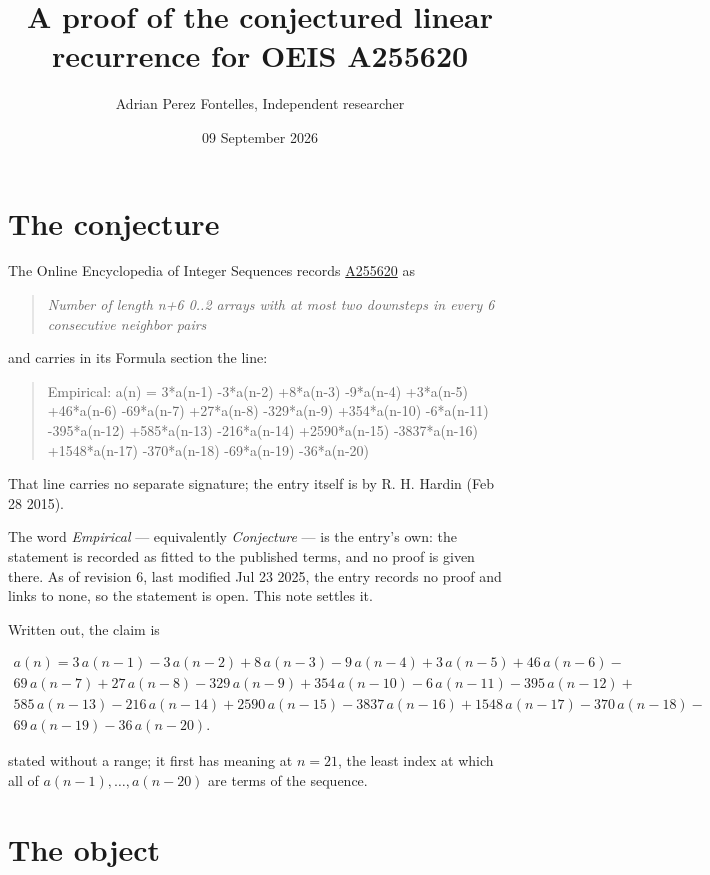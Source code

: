\documentclass[11pt]{article}
\title{A proof of the conjectured linear recurrence for OEIS A255620}
\author{Adrian Perez Fontelles, Independent researcher}
\date{09 September 2026}
\theoremstyle{definition}
\begin{document}
\maketitle
\section{The conjecture}

The Online Encyclopedia of Integer Sequences records \href{https://oeis.org/A255620}{A255620} as

\begin{quote}\itshape Number of length n+6 0..2 arrays with at most two downsteps in every 6 consecutive neighbor pairs\end{quote}

and carries in its Formula section the line:

\begin{quote}\ttfamily Empirical: a(n) = 3*a(n-1) -3*a(n-2) +8*a(n-3) -9*a(n-4) +3*a(n-5) +46*a(n-6) -69*a(n-7) +27*a(n-8) -329*a(n-9) +354*a(n-10) -6*a(n-11) -395*a(n-12) +585*a(n-13) -216*a(n-14) +2590*a(n-15) -3837*a(n-16) +1548*a(n-17) -370*a(n-18) -69*a(n-19) -36*a(n-20)\end{quote}

That line carries no separate signature; the entry itself is by R. H. Hardin (Feb 28 2015).

The word {\itshape Empirical} --- equivalently {\itshape Conjecture} --- is the entry's own: the statement is recorded as fitted to the published terms, and no proof is given there. As of revision 6, last modified Jul 23 2025, the entry records no proof and links to none, so the statement is open. This note settles it.

Written out, the claim is

\begin{multline*} a(n) = 3\,a(n-1) - 3\,a(n-2) + 8\,a(n-3) - 9\,a(n-4) + 3\,a(n-5) + 46\,a(n-6) - \\ 69\,a(n-7) + 27\,a(n-8) - 329\,a(n-9) + 354\,a(n-10) - 6\,a(n-11) - 395\,a(n-12) + \\ 585\,a(n-13) - 216\,a(n-14) + 2590\,a(n-15) - 3837\,a(n-16) + 1548\,a(n-17) - 370\,a(n-18) - \\ 69\,a(n-19) - 36\,a(n-20). \end{multline*}

stated without a range; it first has meaning at $n = 21$, the least index at which all of $a(n-1),\dots,a(n-20)$ are terms of the sequence.

\section{The object}
\end{document}
